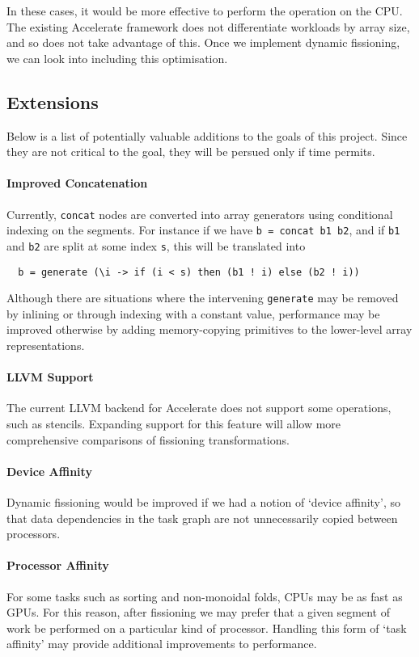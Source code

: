 \documentclass[a4paper,12pt]{article}
\newcommand{\icf}[1]{\mbox{\texttt{#1}}} %
\begin{document}
In these cases, it would be more effective to perform the operation on the CPU.
The existing Accelerate framework does not differentiate workloads by array size, and so does not take advantage of this.
Once we implement dynamic fissioning, we can look into including this optimisation.

\subsection{Extensions}
Below is a list of potentially valuable additions to the goals of this project.
Since they are not critical to the goal, they will be persued only if time permits.

\paragraph*{Improved Concatenation}
Currently, \icf{concat} nodes are converted into array generators using conditional indexing on the segments.
For instance if we have \icf{b\ =\ concat\ b1\ b2}, and if \icf{b1} and \icf{b2} are split at some index \icf{s}, this will be translated into

\begin{verbatim}
  b = generate (\i -> if (i < s) then (b1 ! i) else (b2 ! i))
\end{verbatim}

Although there are situations where the intervening \icf{generate} may be removed by inlining or through indexing with a constant value, performance may be improved otherwise by adding memory-copying primitives to the lower-level array representations.

\paragraph*{LLVM Support}
The current LLVM backend for Accelerate does not support some operations, such as stencils.
Expanding support for this feature will allow more comprehensive comparisons of fissioning transformations.

\paragraph*{Device Affinity}
Dynamic fissioning would be improved if we had a notion of `device affinity', so that data dependencies in the task graph are not unnecessarily copied between processors.

\paragraph*{Processor Affinity}
For some tasks such as sorting and non-monoidal folds, CPUs may be as fast as GPUs.
For this reason, after fissioning we may prefer that a given segment of work be performed on a particular kind of processor.
Handling this form of `task affinity' may provide additional improvements to performance.
    
\end{document}
